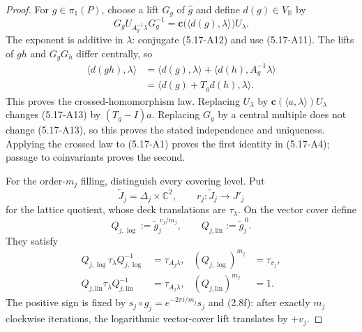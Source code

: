 \begin{proof}
For \(g\in\pi_1(P)\), choose a lift \(G_g\) of \(\widehat g\) and define
\(d(g)\in V_{\mathbb R}\) by
\[
 G_gU_{A_g^{-1}\lambda}G_g^{-1}
 =\mathbf c\bigl(\langle d(g),\lambda\rangle\bigr)U_\lambda.
\tag{5.17-A13}
\]
The exponent is additive in \(\lambda\): conjugate (5.17-A12) and use
(5.17-A11).  The lifts of \(gh\) and \(G_gG_h\) differ centrally, so
\[
\begin{aligned}
 \langle d(gh),\lambda\rangle
 &=\langle d(g),\lambda\rangle
   +\langle d(h),A_g^{-1}\lambda\rangle\\
 &=\langle d(g)+T_gd(h),\lambda\rangle.
\end{aligned}
\]
This proves the crossed-homomorphism law.  Replacing
\(U_\lambda\) by
\(\mathbf c(\langle a,\lambda\rangle)U_\lambda\) changes (5.17-A13) by
\((T_g-I)a\).  Replacing \(G_g\) by a central multiple does not change
(5.17-A13), so this proves the stated independence and uniqueness.  Applying
the crossed law to
(5.17-A1) proves the first identity in (5.17-A4); passage to coinvariants
proves the second.

For the order-\(m_j\) filling, distinguish every covering level.  Put
\[
 \widetilde J_j=\Delta_j\times\mathbb C^2,\qquad
 r_j:\widetilde J_j\longrightarrow J'_j
\]
for the lattice quotient, whose deck translations are \(\tau_\lambda\).
On the vector cover define
\[
 Q_{j,\log}:=\widetilde g_j^{\,v_j/m_j},\qquad
 Q_{j,\mathrm{lin}}:=\widetilde g_j^{\,0}.
\]
They satisfy
\[
\begin{aligned}
 Q_{j,\log}\tau_\lambda Q_{j,\log}^{-1}
  &=\tau_{A_j\lambda},&
 (Q_{j,\log})^{m_j}&=\tau_{v_j},\\
 Q_{j,\mathrm{lin}}\tau_\lambda Q_{j,\mathrm{lin}}^{-1}
  &=\tau_{A_j\lambda},&
 (Q_{j,\mathrm{lin}})^{m_j}&=1.
\end{aligned}
\tag{5.17-A14}
\]
The positive sign is fixed by
\(s_j\circ g_j=e^{-2\pi i/m_j}s_j\) and (2.8f): after exactly
\(m_j\) clockwise iterations, the logarithmic vector-cover lift translates
by \(+v_j\).


\end{proof}

